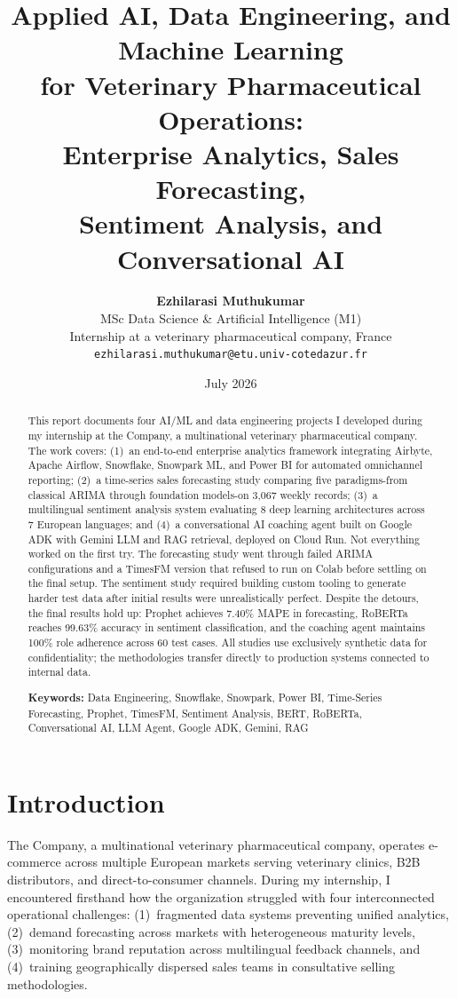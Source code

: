 \documentclass[11pt,a4paper]{article}
\title{\vspace{-1.5cm}\textbf{Applied AI, Data Engineering, and Machine Learning\\for Veterinary Pharmaceutical Operations:\\Enterprise Analytics, Sales Forecasting,\\Sentiment Analysis, and Conversational AI}\vspace{-0.3cm}}
\author{
    \textbf{Ezhilarasi Muthukumar}\\
    \small MSc Data Science \& Artificial Intelligence (M1)\\
    \small Internship at a veterinary pharmaceutical company, France\\
    \small \texttt{ezhilarasi.muthukumar@etu.univ-cotedazur.fr}
}
\date{\small July 2026}
\begin{document}
\maketitle
\thispagestyle{fancy}

\begin{abstract}
\noindent This report documents four AI/ML and data engineering projects I developed during my internship at the Company, a multinational veterinary pharmaceutical company. The work covers: (1)~an end-to-end enterprise analytics framework integrating Airbyte, Apache Airflow, Snowflake, Snowpark ML, and Power BI for automated omnichannel reporting; (2)~a time-series sales forecasting study comparing five paradigms-from classical ARIMA through foundation models-on 3,067 weekly records; (3)~a multilingual sentiment analysis system evaluating 8 deep learning architectures across 7 European languages; and (4)~a conversational AI coaching agent built on Google ADK with Gemini LLM and RAG retrieval, deployed on Cloud Run. Not everything worked on the first try. The forecasting study went through failed ARIMA configurations and a TimesFM version that refused to run on Colab before settling on the final setup. The sentiment study required building custom tooling to generate harder test data after initial results were unrealistically perfect. Despite the detours, the final results hold up: Prophet achieves 7.40\% MAPE in forecasting, RoBERTa reaches 99.63\% accuracy in sentiment classification, and the coaching agent maintains 100\% role adherence across 60 test cases. All studies use exclusively synthetic data for confidentiality; the methodologies transfer directly to production systems connected to internal data.

\medskip
\noindent\textbf{Keywords:} Data Engineering, Snowflake, Snowpark, Power BI, Time-Series Forecasting, Prophet, TimesFM, Sentiment Analysis, BERT, RoBERTa, Conversational AI, LLM Agent, Google ADK, Gemini, RAG
\end{abstract}

\section{Introduction}

The Company, a multinational veterinary pharmaceutical company, operates e-commerce across multiple European markets serving veterinary clinics, B2B distributors, and direct-to-consumer channels. During my internship, I encountered firsthand how the organization struggled with four interconnected operational challenges: (1)~fragmented data systems preventing unified analytics, (2)~demand forecasting across markets with heterogeneous maturity levels, (3)~monitoring brand reputation across multilingual feedback channels, and (4)~training geographically dispersed sales teams in consultative selling methodologies.
\end{document}
